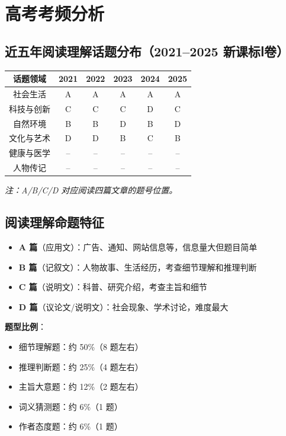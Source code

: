 \section{高考考频分析}

\subsection{近五年阅读理解话题分布（2021--2025 新课标Ⅰ卷）}

\begin{center}
\begin{tabular}{c|c|c|c|c|c}
\textbf{话题领域} & \textbf{2021} & \textbf{2022} & \textbf{2023} & \textbf{2024} & \textbf{2025} \\ \toprule
社会生活 & A & A & A & A & A \\
科技与创新 & C & C & C & D & C \\
自然环境 & B & B & D & B & D \\
文化与艺术 & D & D & B & C & B \\
健康与医学 & -- & -- & -- & -- & -- \\
人物传记 & -- & -- & -- & -- & -- \\
\bottomrule
\end{tabular}
\end{center}

\textit{注：A/B/C/D 对应阅读四篇文章的题号位置。}

\subsection{阅读理解命题特征}

\begin{itemize}
  \item \textbf{A 篇}（应用文）：广告、通知、网站信息等，信息量大但题目简单
  \item \textbf{B 篇}（记叙文）：人物故事、生活经历，考查细节理解和推理判断
  \item \textbf{C 篇}（说明文）：科普、研究介绍，考查主旨和细节
  \item \textbf{D 篇}（议论文/说明文）：社会现象、学术讨论，难度最大
\end{itemize}

\textbf{题型比例}：
\begin{itemize}
  \item 细节理解题：约 50\%（8 题左右）
  \item 推理判断题：约 25\%（4 题左右）
  \item 主旨大意题：约 12\%（2 题左右）
  \item 词义猜测题：约 6\%（1 题）
  \item 作者态度题：约 6\%（1 题）
\end{itemize}


